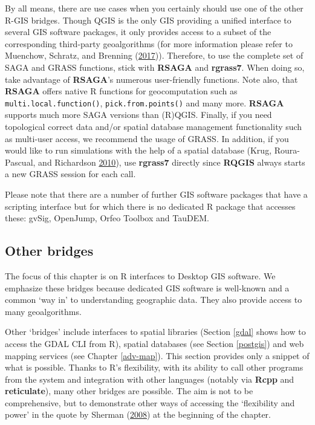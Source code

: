 \documentclass[]{krantz}
\begin{document}
By all means, there are use cases when you certainly should use one of the other R-GIS bridges.
Though QGIS is the only GIS providing a unified interface to several GIS software packages, it only provides access to a subset of the corresponding third-party geoalgorithms (for more information please refer to Muenchow, Schratz, and Brenning (\protect\hyperlink{ref-muenchow_rqgis:_2017}{2017})).
Therefore, to use the complete set of SAGA and GRASS functions, stick with \textbf{RSAGA} and \textbf{rgrass7}.
When doing so, take advantage of \textbf{RSAGA}'s numerous user-friendly functions.
Note also, that \textbf{RSAGA} offers native R functions for geocomputation such as \texttt{multi.local.function()}, \texttt{pick.from.points()} and many more.
\textbf{RSAGA} supports much more SAGA versions than (R)QGIS.
Finally, if you need topological correct data and/or spatial database management functionality such as multi-user access, we recommend the usage of GRASS.
In addition, if you would like to run simulations with the help of a spatial database (Krug, Roura-Pascual, and Richardson \protect\hyperlink{ref-krug_clearing_2010}{2010}), use \textbf{rgrass7} directly since \textbf{RQGIS} always starts a new GRASS session for each call.

Please note that there are a number of further GIS software packages that have a scripting interface but for which there is no dedicated R package that accesses these: gvSig, OpenJump, Orfeo Toolbox and TauDEM.

\hypertarget{other-bridges}{%
\subsection{Other bridges}\label{other-bridges}}

The focus of this chapter is on R interfaces to Desktop GIS software.
We emphasize these bridges because dedicated GIS software is well-known and a common `way in' to understanding geographic data.
They also provide access to many geoalgorithms.

Other `bridges' include interfaces to spatial libraries (Section \ref{gdal} shows how to access the GDAL CLI from R), spatial databases (see Section \ref{postgis}) and web mapping services (see Chapter \ref{adv-map}).
This section provides only a snippet of what is possible.
Thanks to R's flexibility, with its ability to call other programs from the system and integration with other languages (notably via \textbf{Rcpp} and \textbf{reticulate}), many other bridges are possible.
The aim is not to be comprehensive, but to demonstrate other ways of accessing the `flexibility and power' in the quote by Sherman (\protect\hyperlink{ref-sherman_desktop_2008}{2008}) at the beginning of the chapter.
\end{document}
